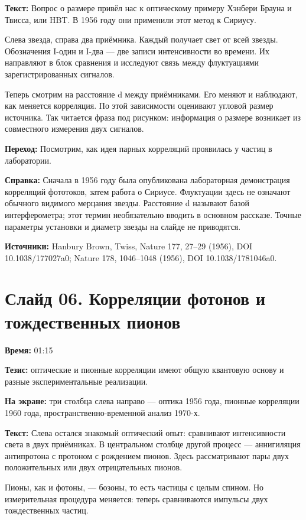 \documentclass[11pt,a4paper]{article}
\begin{document}
\textbf{Текст:} Вопрос о размере привёл нас к оптическому примеру Хэнбери Брауна и Твисса, или HBT. В 1956 году они применили этот метод к Сириусу.

Слева звезда, справа два приёмника. Каждый получает свет от всей звезды. Обозначения I-один и I-два — две записи интенсивности во времени. Их направляют в блок сравнения и исследуют связь между флуктуациями зарегистрированных сигналов.

Теперь смотрим на расстояние d между приёмниками. Его меняют и наблюдают, как меняется корреляция. По этой зависимости оценивают угловой размер источника. Так читается фраза под рисунком: информация о размере возникает из совместного измерения двух сигналов.

\textbf{Переход:} Посмотрим, как идея парных корреляций проявилась у частиц в лаборатории.

\textbf{Справка:} Сначала в 1956 году была опубликована лабораторная демонстрация корреляций фототоков, затем работа о Сириусе. Флуктуации здесь не означают обычного видимого мерцания звезды. Расстояние d называют базой интерферометра; этот термин необязательно вводить в основном рассказе. Точные параметры установки и диаметр звезды на слайде не приводятся.

\textbf{Источники:} Hanbury Brown, Twiss, Nature 177, 27–29 (1956), DOI 10.1038/177027a0; Nature 178, 1046–1048 (1956), DOI 10.1038/1781046a0.

\clearpage
\section*{Слайд 06. Корреляции фотонов и тождественных пионов}
\textbf{Время:} 01:15

\textbf{Тезис:} оптические и пионные корреляции имеют общую квантовую основу и разные экспериментальные реализации.

\textbf{На экране:} три столбца слева направо — оптика 1956 года, пионные корреляции 1960 года, пространственно-временной анализ 1970-х.

\textbf{Текст:} Слева остался знакомый оптический опыт: сравнивают интенсивности света в двух приёмниках. В центральном столбце другой процесс — аннигиляция антипротона с протоном с рождением пионов. Здесь рассматривают пары двух положительных или двух отрицательных пионов.

Пионы, как и фотоны, — бозоны, то есть частицы с целым спином. Но измерительная процедура меняется: теперь сравниваются импульсы двух тождественных частиц.
\end{document}
